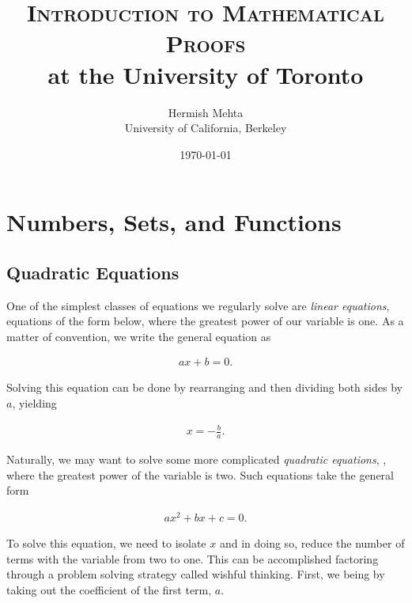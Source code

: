 \documentclass[twoside]{report}
\begin{document}
\title{\textsc{Introduction to Mathematical Proofs} \\
	\large at the University of Toronto}
\author{Hermish Mehta \\ University of California, Berkeley}
\date{\today}
\maketitle

\tableofcontents

\chapter{Numbers, Sets, and Functions}

\section{Quadratic Equations}

One of the simplest classes of equations we regularly solve are \emph{linear equations},  equations of the form below, where the greatest power of our variable is one. As a matter of convention, we write the general equation as

\begin{align}
	ax + b = 0.
\end{align}

Solving this equation can be done by rearranging and then dividing both sides by $a$, yielding

\begin{align*}
	x = -\frac{b}{a}.
\end{align*}

Naturally, we may want to solve some more complicated \textit{quadratic equations}, , where the greatest power of the variable is two. Such equations take the general form

\begin{align}
	ax^2 + bx + c = 0.
\end{align}

To solve this equation, we need to isolate $x$ and in doing so, reduce the number of terms with the variable from two to one. This can be accomplished factoring through a problem solving strategy called wishful thinking. First, we being by taking out the coefficient of the first term, $a$.
\end{document}
